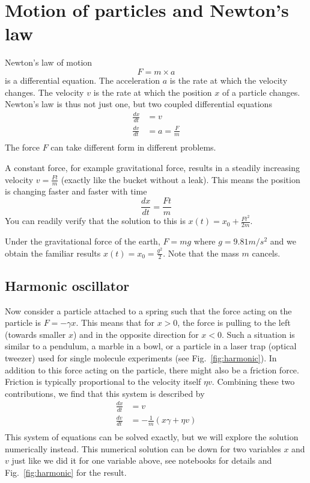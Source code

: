 \section{Motion of particles and Newton's law}
Newton's law of motion
\begin{equation}
    F = m\times a
\end{equation}
is a differential equation. The acceleration $a$ is the rate at which the velocity changes.
The velocity $v$ is the rate at which the position $x$ of a particle changes.
Newton's law is thus not just one, but two coupled differential equations
\begin{equation}
    \begin{split}
        \frac{dx}{dt} & = v \\
        \frac{dv}{dt} & = a = \frac{F}{m} \\
    \end{split}
\end{equation}
The force $F$ can take different form in different problems.

A constant force, for example gravitational force, results in a steadily increasing velocity $v = \frac{Ft}{m}$ (exactly like the bucket without a leak).
This means the position is changing faster and faster with time
\begin{equation}
    \frac{dx}{dt} = \frac{Ft}{m}
\end{equation}
You can readily verify that the solution to this is $x(t) = x_0 + \frac{Ft^2}{2m}$.

Under the gravitational force of the earth, $F = m g$ where $g = 9.81 m/s^2$ and we obtain the familiar results $x(t) = x_0 = \frac{g ^2}{2}$. Note that the mass $m$ cancels.

\subsection{Harmonic oscillator}
Now consider a particle attached to a spring such that the force acting on the particle is $F = -\gamma x$.
This means that for $x>0$, the force is pulling to the left (towards smaller $x$) and in the opposite direction for $x<0$.
Such a situation is similar to a pendulum, a marble in a bowl, or a particle in a laser trap (optical tweezer) used for single molecule experiments (see Fig.~\ref{fig:harmonic}).
In addition to this force acting on the particle, there might also be a friction force.
Friction is typically proportional to the velocity itself $\eta v$.
Combining these two contributions, we find that this system is described by
\begin{equation}
    \label{eq:harmonic}
    \begin{split}
        \frac{dx}{dt} & = v \\
        \frac{dv}{dt} & = -\frac{1}{m} \left( x\gamma +  \eta v\right)\\
    \end{split}
\end{equation}
This system of equations can be solved exactly, but we will explore the solution numerically instead.
This numerical solution can be down for two variables $x$ and $v$ just like we did it for one variable above, see notebooks for details and Fig.~\ref{fig:harmonic} for the result.

